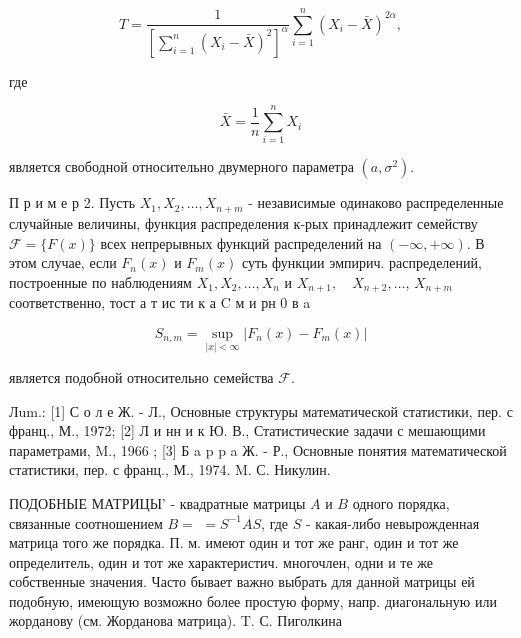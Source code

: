 \documentclass[10pt]{article}
\begin{document}
\[

T=\frac{1}{\left[\sum_{i=1}^{n}\left(X_{i}-\bar{X}\right)^{2}\right]^{\alpha}} \sum_{i=1}^{n}\left(X_{i}-\bar{X}\right)^{2 \alpha},

\]



где



\[

\bar{X}=\frac{1}{n} \sum_{i=1}^{n} X_{i}

\]



является свободной относительно двумерного параметра $\left(a, \sigma^{2}\right)$.



П р и м е р 2. Пусть $X_{1}, X_{2}, \ldots, X_{n+m}$ - независимые одинаково распределенные случайные величины, функция распределения к-рых принадлежит семейству $\mathscr{\mathscr { F }}=\{F(x)\}$ всех непрерывных функций распределений на $(-\infty,+\infty)$. В этом случае, если $F_{n}(x)$ и $F_{m}(x)$ суть функции эмпирич. распределений, построенные по наблюдениям $X_{1}, X_{2}, \ldots, X_{n}$ и $X_{n+1}, \quad X_{n+2}, \ldots$, $X_{n+m}$ соответственно, тост а т ис ти к а $\mathrm{C}$ м и рн 0 в a



\[

S_{n, m}=\sup _{|x|<\infty}\left|F_{n}(x)-F_{m}(x)\right|

\]



является подобной относительно семейства $\mathscr{F}$.



Лum.: [1] С о л е Ж. - Л., Основные структуры математической статистики, пер. с франц., М., 1972; [2] Л и нн и к Ю. В., Статистические задачи с мешающими параметрами, M., 1966 ; [3] Б a p p a Ж. - Р., Основные понятия математической статистики, пер. с франц., М., 1974. M. С. Никулин.



ПОДОБНЫЕ МАТРИЦЫ' - квадратные матрицы $A$ и $B$ одного порядка, связанные соотношением $B=$ $=S^{-1} A S$, где $S$ - какая-либо невырожденная матрица того же порядка. П. м. имеют один и тот же ранг, один и тот же определитель, один и тот же характеристич. многочлен, одни и те же собственные значения. Часто бывает важно выбрать для данной матрицы ей подобную, имеющую возможно более простую форму, напр. диагональную или жорданову (см. Жорданова матрица). T. С. Пиголкина
\end{document}
